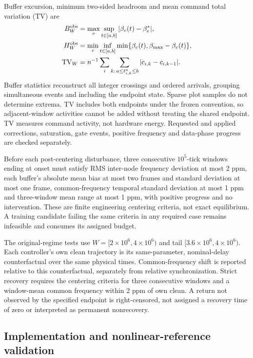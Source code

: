 Buffer excursion, minimum two-sided headroom and mean command total
variation (TV) are
\begin{align}
 B_W^{\rm obs}&=\max_e\sup_{t\in[a,b]}|\beta_e(t)-\beta_e^*|,\nonumber\\
 H_W^{\rm obs}&=\min_e\inf_{t\in[a,b]}
                         \min\{\beta_e(t),\beta_{\max}-\beta_e(t)\},
 \label{detail:eq:eval_buffer_metrics}\\
 \mathrm{TV}_W&=n^{-1}\sum_i
       \sum_{k:\,a\le t^a_{i,k}\le b}|c_{i,k}-c_{i,k-1}|.
 \label{detail:eq:eval_tv}
\end{align}
Buffer statistics reconstruct all integer crossings and ordered arrivals,
grouping simultaneous events and including the endpoint state. Sparse
plot samples do not determine extrema. TV includes both endpoints under
the frozen convention, so adjacent-window activities cannot be added
without treating the shared endpoint. TV measures command activity,
not hardware energy. Requested and applied corrections, saturation,
gate events, positive frequency and data-phase progress are checked
separately.

Before each post-centering disturbance, three consecutive $10^5$-tick
windows ending at onset must satisfy RMS inter-node frequency deviation at most 2 ppm,
each buffer's absolute mean bias at most two frames and standard
deviation at most one frame, common-frequency temporal standard
deviation at most 1 ppm and three-window mean range at most 1 ppm,
with positive progress and no intervention. These are finite
engineering centering criteria, not exact equilibrium. A training
candidate failing the same criteria in any required case remains
infeasible and consumes its assigned budget.

The original-regime tests use $W=[2\times10^6,4\times10^6)$ and tail
$[3.6\times10^6,4\times10^6)$. Each controller's own clean trajectory
is its same-parameter, nominal-delay counterfactual over the same
physical times. Common-frequency shift is reported relative to this
counterfactual, separately from relative synchronization. Strict
recovery requires the centering criteria for three consecutive windows
and a window-mean common frequency within 2 ppm of own clean. A return
not observed by the specified endpoint is right-censored, not assigned
a recovery time of zero or interpreted as permanent nonrecovery.

\subsection{Implementation and nonlinear-reference validation}
\label{detail:subsec:eval_implementation_reference}

